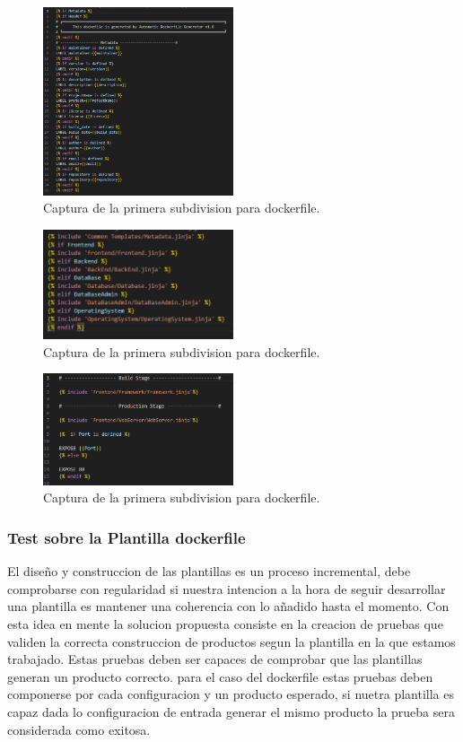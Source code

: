 \documentclass[12pt, a4paper, twoside]{article}
\begin{document}
\begin{figure}[ht]
	\centering
	  \includegraphics[width=0.5\textwidth]{dockerfile.metadata.png}
	\caption{Captura de la primera subdivision para dockerfile.}
\end{figure}

\begin{figure}[ht]
	\centering
	  \includegraphics[width=0.5\textwidth]{dockerfile.logica.plantillas.jinja.png}
	\caption{Captura de la primera subdivision para dockerfile.}
\end{figure}

\begin{figure}[ht]
	\centering
	  \includegraphics[width=0.5\textwidth]{dockerfile.frontend.jinja.template.png}
	\caption{Captura de la primera subdivision para dockerfile.}
\end{figure}

\subsubsection{Test sobre la Plantilla dockerfile}
El diseño y construccion de las plantillas es un proceso incremental, debe comprobarse con regularidad si nuestra intencion a la hora de seguir desarrollar una plantilla es mantener 
una coherencia con lo añadido hasta el momento. Con esta idea en mente la solucion propuesta consiste en la creacion de pruebas que validen la correcta construccion de productos segun la plantilla en la que estamos trabajado.
Estas pruebas deben ser capaces de comprobar que las plantillas generan un producto correcto. para el caso del dockerfile estas pruebas deben componerse por cada configuracion 
y un producto esperado, si nuetra plantilla es capaz dada lo configuracion de entrada generar el mismo producto la prueba sera considerada como exitosa. 
\end{document}
